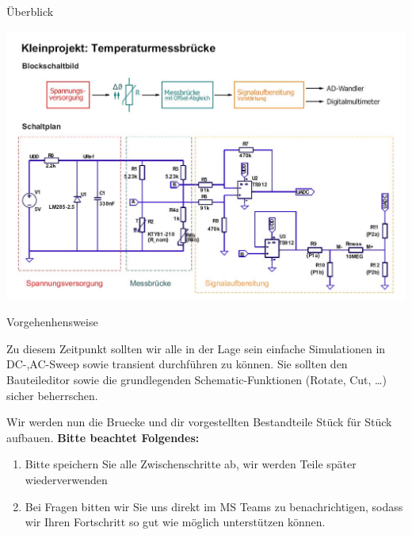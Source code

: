 \begin{frame}[t]{Überblick} 
    
    \begin{spacing}{0.9} \begin{tiny}
        \begin{minipage}{\textwidth}
          \includegraphics[width=\linewidth]{pictures/projekt_overview.jpg}
        \end{minipage} 
    \end{tiny} \end{spacing}

\end{frame}

\begin{frame}[t]{Vorgehenhensweise} 
    
    Zu diesem Zeitpunkt sollten wir alle in der Lage sein einfache Simulationen in DC-,AC-Sweep sowie transient
    durchführen zu können. Sie sollten den Bauteileditor sowie die grundlegenden Schematic-Funktionen (Rotate, Cut, \dots) 
    sicher beherrschen. 

    Wir werden nun die Bruecke und dir vorgestellten Bestandteile Stück für Stück aufbauen. 
    \textbf{Bitte beachtet Folgendes:}

    \begin{enumerate}
        \item Bitte speichern Sie alle Zwischenschritte ab, wir werden Teile später wiederverwenden
        \item Bei Fragen bitten wir Sie uns direkt im MS Teams zu benachrichtigen, sodass wir Ihren
        Fortschritt so gut wie möglich unterstützen können. 
    \end{enumerate}
\end{frame}

